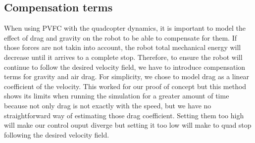 \subsection{Compensation terms}
When using PVFC with the quadcopter dynamics, it is important to model the effect of drag and gravity on the robot to be able to compensate for them. If those forces are not takin into account, the robot total mechanical energy will decrease until it arrives to a complete stop. 
Therefore, to ensure the robot will continue to follow the desired velocity field, we have to introduce compensation terms for gravity and air drag. 
For simplicity, we chose to model drag as a linear coefficient of the velocity. This worked for our proof of concept but this method 
shows its limits when running the simulation for a greater amount of time because not only drag is not exactly with the speed, but we have no straightforward way of estimating those drag coefficient.
Setting them too high will make our control ouput diverge but setting it too low will make to quad stop following the desired velocity field.  
